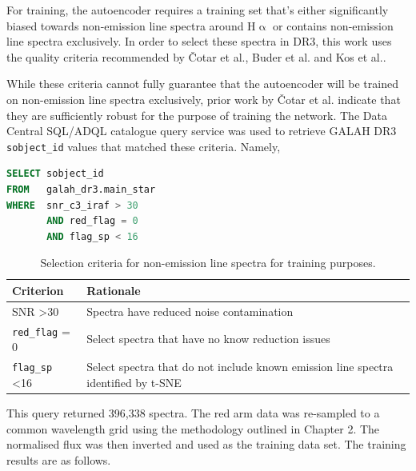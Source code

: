 For training, the autoencoder requires a training set that's either significantly biased towards non-emission line spectra around H$\upalpha$ or contains non-emission line spectra exclusively. In order to select these spectra in DR3, this work uses the quality criteria recommended by Čotar et al.\cite{vcotar2021galah}, Buder et al.\cite{buder2021galah+} and Kos et al.\cite{kos2017galah}. 

While these criteria cannot fully guarantee that the autoencoder will be trained on non-emission line spectra exclusively, prior work by Čotar et al. indicate that they are sufficiently robust for the purpose of training the network. The Data Central SQL/ADQL catalogue query service was used to retrieve GALAH DR3 \texttt{sobject\_id} values that matched these criteria. Namely,

\begin{lstlisting}[language=SQL]
SELECT sobject_id
FROM   galah_dr3.main_star
WHERE  snr_c3_iraf > 30
       AND red_flag = 0
       AND flag_sp < 16 
\end{lstlisting}

\begin{table}[!htb]
\begin{center}
\begin{tabular}{|l|l|}
\hline
\textbf{Criterion}    & \textbf{Rationale}                                                                 \\ \hline
SNR \textgreater 30   & Spectra have reduced noise contamination      \\ \hline
\texttt{red\_flag} = 0         & Select spectra that have no know reduction issues                                  \\ \hline
\texttt{flag\_sp} \textless 16 & Select spectra that do not include known emission line spectra identified by t-SNE \\ \hline
\end{tabular}
\caption{Selection criteria for non-emission line spectra for training purposes.}
\label{table:Selection Criteria}
\end{center}
\end{table}

This query returned 396,338 spectra. The red arm data was re-sampled to a common wavelength grid using the methodology outlined in Chapter 2. The normalised flux was then inverted and used as the training data set. The training results are as follows.

